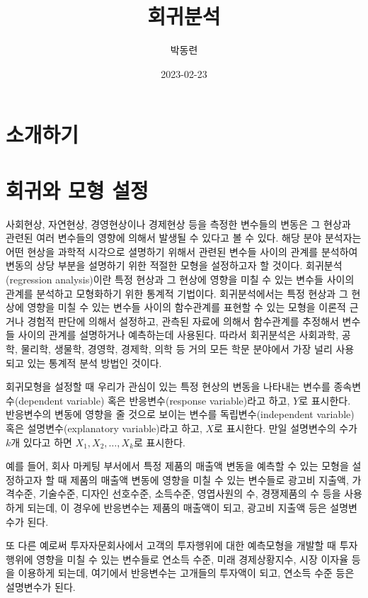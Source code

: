 \documentclass[
]{book}
\title{회귀분석}
\author{박동련}
\date{2023-02-23}
\begin{document}
\maketitle

{
\setcounter{tocdepth}{1}
\tableofcontents
}
\hypertarget{uxc18cuxac1cuxd558uxae30}{%
\chapter*{소개하기}\label{uxc18cuxac1cuxd558uxae30}}

\hypertarget{ch1}{%
\chapter{회귀와 모형 설정}\label{ch1}}

사회현상, 자연현상, 경영현상이나 경제현상 등을 측정한 변수들의 변동은 그 현상과 관련된 여러 변수들의 영향에 의해서 발생될 수 있다고 볼 수 있다.
해당 분야 분석자는 어떤 현상을 과학적 시각으로 셜명하기 위해서 관련된 변수들 사이의 관계를 분석하여 변동의 상당 부분을 설명하기 위한 적절한 모형을 설정하고자 할 것이다.
회귀분석(regression analysis)이란 특정 현상과 그 현상에 영향을 미칠 수 있는 변수들 사이의 관계를 분석하고 모형화하기 위한 통계적 기법이다.
회귀분석에서는 특정 현상과 그 현상에 영향을 미칠 수 있는 변수들 사이의 함수관계를 표현할 수 있는 모형을 이론적 근거나 경험적 판단에 의해서 설정하고, 관측된 자료에 의해서 함수관계를 추정해서 변수들 사이의 관계를 설명하거나 예측하는데 사용된다.
따라서 회귀분석은 사회과학, 공학, 물리학, 생물학, 경영학, 경제학, 의학 등 거의 모든 학문 분야에서 가장 널리 사용되고 있는 통계적 분석 방법인 것이다.

회귀모형을 설정할 때 우리가 관심이 있는 특정 현상의 변동을 나타내는 변수를 종속변수(dependent variable) 혹은 반응변수(response variable)라고 하고, \(Y\)로 표시한다.
반응변수의 변동에 영향을 줄 것으로 보이는 변수를 독립변수(independent variable) 혹은 설명변수(explanatory variable)라고 하고, \(X\)로 표시한다.
만일 설명변수의 수가 \(k\)개 있다고 하면 \(X_{1}, X_{2}, \ldots, X_{k}\)로 표시한다.

예를 들어, 회사 마케팅 부서에서 특정 제품의 매출액 변동을 예측할 수 있는 모형을 설정하고자 할 때 제품의 매출액 변동에 영향을 미칠 수 있는 변수들로 광고비 지출액, 가격수준, 기술수준, 디자인 선호수준, 소득수준, 영엽사원의 수, 경쟁제품의 수 등을 사용하게 되는데, 이 경우에 반응변수는 제품의 매출액이 되고, 광고비 지출액 등은 설명변수가 된다.

또 다른 예로써 투자자문회사에서 고객의 투자행위에 대한 예측모형을 개발할 때 투자행위에 영향을 미칠 수 있는 변수들로 연소득 수준, 미래 경제상황지수, 시장 이자율 등을 이용하게 되는데, 여기에서 반응변수는 고개들의 투자액이 되고, 연소득 수준 등은 설명변수가 된다.
\end{document}
